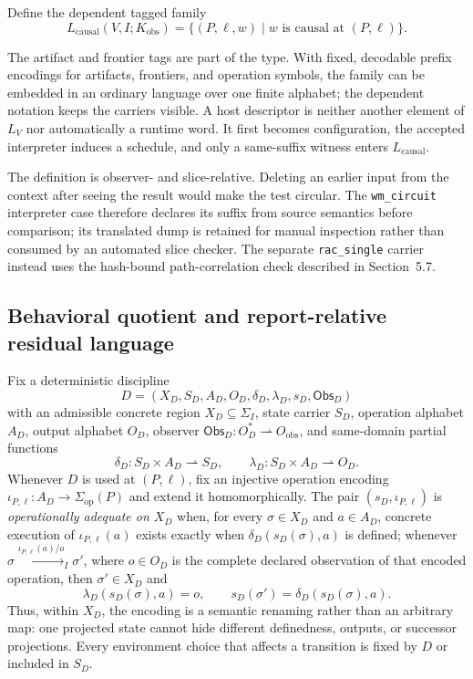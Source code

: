 \documentclass[conference]{IEEEtran}
\begin{document}
Define the dependent tagged family
\begin{equation}
L_{\mathrm{causal}}(V,I;K_{\mathrm{obs}})
=
\{(P,\ell,w)\mid w\text{ is causal at }(P,\ell)\}.
\end{equation}

The artifact and frontier tags are part of the type. With fixed, decodable prefix encodings for artifacts, frontiers, and operation symbols, the family can be embedded in an ordinary language over one finite alphabet; the dependent notation keeps the carriers visible. A host descriptor is neither another element of $L_V$ nor automatically a runtime word. It first becomes configuration, the accepted interpreter induces a schedule, and only a same-suffix witness enters $L_{\mathrm{causal}}$.

The definition is observer- and slice-relative. Deleting an earlier input from the context after seeing the result would make the test circular. The \texttt{wm\_circuit} interpreter case therefore declares its suffix from source semantics before comparison; its translated dump is retained for manual inspection rather than consumed by an automated slice checker. The separate \texttt{rac\_single} carrier instead uses the hash-bound path-correlation check described in Section~5.7.

\subsection{Behavioral quotient and report-relative residual language}

Fix a deterministic discipline
\begin{equation}
D=(X_D,S_D,A_D,O_D,\delta_D,\lambda_D,s_D,\mathsf{Obs}_D)
\end{equation}
with an admissible concrete region $X_D\subseteq\Sigma_I$, state carrier $S_D$, operation alphabet $A_D$, output alphabet $O_D$, observer $\mathsf{Obs}_D:O_D^*\rightharpoonup O_{\mathrm{obs}}$, and same-domain partial functions
\begin{equation}
\delta_D:S_D\times A_D\rightharpoonup S_D,
\qquad
\lambda_D:S_D\times A_D\rightharpoonup O_D.
\end{equation}
Whenever $D$ is used at $(P,\ell)$, fix an injective operation encoding $\iota_{P,\ell}:A_D\to\Sigma_{\mathrm{op}}(P)$ and extend it homomorphically. The pair $(s_D,\iota_{P,\ell})$ is \emph{operationally adequate on $X_D$} when, for every $\sigma\in X_D$ and $a\in A_D$, concrete execution of $\iota_{P,\ell}(a)$ exists exactly when $\delta_D(s_D(\sigma),a)$ is defined; whenever
$\sigma\xrightarrow{\iota_{P,\ell}(a)/o}_I\sigma'$, where $o\in O_D$ is the complete declared observation of that encoded operation, then $\sigma'\in X_D$ and
\begin{equation}
\lambda_D(s_D(\sigma),a)=o,
\qquad
s_D(\sigma')=\delta_D(s_D(\sigma),a).
\end{equation}
Thus, within $X_D$, the encoding is a semantic renaming rather than an arbitrary map: one projected state cannot hide different definedness, outputs, or successor projections. Every environment choice that affects a transition is fixed by $D$ or included in $S_D$.
\end{document}
